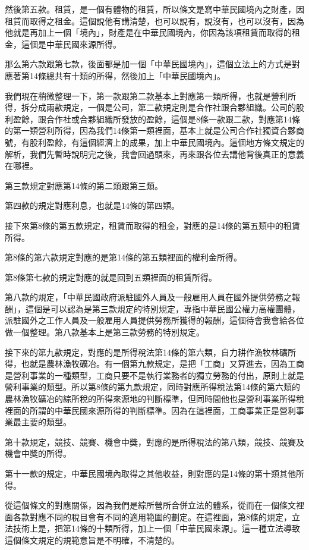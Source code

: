 \documentclass[oneside,sub3section]{ctexbook}
\begin{document}
然後第五款。租賃，是一個有體物的租賃，所以條文是寫中華民國境內之財產，因租賃而取得之租金。這個說他有講清楚，也可以說有，說沒有，也可以沒有，因為他就是再加上一個「境內」，財產是在中華民國境內，你因為該項租賃而取得的租金，這個是中華民國來源所得。

那么第六款跟第七款，後面都是加一個「中華民國境內」，這個立法上的方式是對應著第14條總共有十類的所得，然後加上「中華民國境內」。

我們現在稍微整理一下，第一款跟第二款基本上對應第一類所得，也就是營利所得，拆分成兩款規定，一個是公司，第二款規定則是合作社跟合夥組織。公司的股利盈餘，跟合作社或合夥組織所發放的盈餘，這個是8條一款跟二款，對應第14條的第一類營利所得，因為我們14條第一類裡面，基本上就是公司合作社獨資合夥商號，有股利盈餘，有這個經濟上的成果，加上中華民國境內。這個地方條文規定的解析，我們先暫時說明完之後，我會回過頭來，再來跟各位去講他背後真正的意義在哪裡。

第三款規定對應第14條的第二類跟第三類。

第四款的規定對應利息，也就是14條的第四類。

接下來第8條的第五款規定，租賃而取得的租金，對應的是14條的第五類中的租賃所得。

第8條的第六款規定對應的是第14條的第五類裡面的權利金所得。

第8條第七款的規定對應的就是回到五類裡面的租賃所得。

第八款的規定，「中華民國政府派駐國外人員及一般雇用人員在國外提供勞務之報酬」，這個是可以認為是第三款規定的特別規定，專指中華民國公權力高權團體，派駐國外之工作人員及一般雇用人員提供勞務所獲得的報酬，這個待會我會給各位做一個整理。第八款基本上是第三款勞務的特別規定。

接下來的第九款規定，對應的是所得稅法第14條的第六類，自力耕作漁牧林礦所得，也就是農林漁牧礦冶。有一個第九款規定，是把「工商」又算進去，因為工商是營利事業的一種類型，工商只要不是執行業務者的獨立勞務的付出，原則上就是營利事業的類型。所以第8條的第九款規定，同時對應所得稅法第14條的第六類的農林漁牧礦冶的綜所稅的所得來源地的判斷標準，但同時間他也是營利事業所得稅裡面的所謂的中華民國來源所得的判斷標準。因為在這裡面，工商事業正是營利事業最主要的類型。

第十款規定，競技、競賽、機會中獎，對應的是所得稅法的第八類，競技、競賽及機會中獎的所得。

第十一款的規定，中華民國境內取得之其他收益，則對應的是14條的第十類其他所得。

從這個條文的對應關係，因為我們是綜所營所合併立法的體系，從而在一個條文裡面各款對應不同的稅目會有不同的適用範圍的劃定。在這裡面，第8條的規定，立法技術上是，把第14條的十類所得，加上一個「中華民國來源」。這一種立法導致這個條文規定的規範意旨是不明確，不清楚的。
\end{document}
